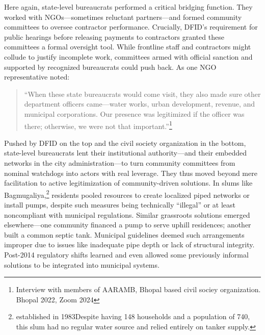 Here again, state-level bureaucrats performed a critical bridging function. They worked with NGOs—sometimes reluctant partners—and formed community committees to oversee contractor performance.\citep{kumar_barriers_2016} Crucially, DFID’s requirement for public hearings before releasing payments to contractors granted these committees a formal oversight tool. While frontline staff and contractors might collude to justify incomplete work, committees armed with official sanction and supported by recognized bureaucrats could push back. As one NGO representative noted:
\begin{quote} “When these state bureaucrats would come visit, they also made sure other department officers came—water works, urban development, revenue, and municipal corporations. Our presence was legitimized if the officer was there; otherwise, we were not that important.”\footnote{Interview with members of AARAMB, Bhopal based civil sociey organization. Bhopal 2022, Zoom 2024} \end{quote}


Pushed by DFID on the top and the civil society organization in the bottom, state-level bureaucrats lent their institutional authority—and their embedded networks in the city administration—to turn community committees from nominal watchdogs into actors with real leverage. They thus moved beyond mere facilitation to active legitimization of community-driven solutions. In slums like Bagmugaliya,\footnote{established in 1983Despite having 148 households and a population of 740, this slum had no regular water source and relied entirely on tanker supply. }  residents pooled resources to create localized piped networks or install pumps, despite such measures being technically “illegal” or at least noncompliant with municipal regulations.\citep{noauthor_poverty_2006} Similar grassroots solutions emerged elsewhere—one community financed a pump to serve uphill residences; another built a common septic tank. Municipal guidelines deemed such arrangements improper due to issues like inadequate pipe depth or lack of structural integrity. Post-2014 regulatory shifts learned and even allowed some previously informal solutions to be integrated into municipal systems.


